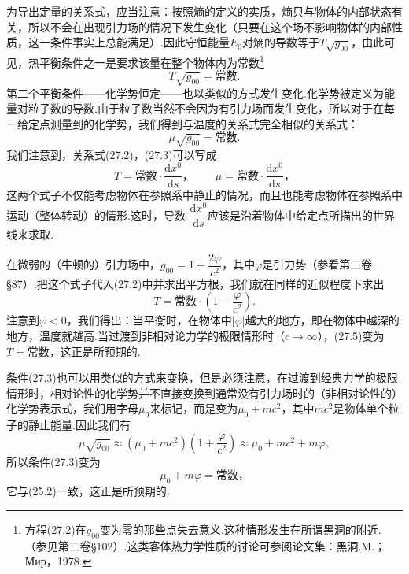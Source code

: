 为导出定量的关系式，应当注意：按照熵的定义的实质，熵只与物体的内部状态有关，所以不会在出现引力场的情况下发生变化（只要在这个场不影响物体的内部性质，这一条件事实上总能满足）.因此守恒能量$E_0$对熵的导数等于$T\sqrt{g_{00}}$，由此可见，热平衡条件之一是要求该量在整个物体内为常数\footnote{方程(27.2)在$g_{00}$变为零的那些点失去意义.这种情形发生在所谓黑洞的附近.（参见第二卷§102）.这类客体热力学性质的讨论可参阅论文集：黑洞.M.；Мир，1978.}
\begin{equation}
  T\sqrt{g_{00}}=\text{常数.}
\end{equation}
第二个平衡条件——化学势恒定——也以类似的方式发生变化.化学势被定义为能量对粒子数的导数.由于粒子数当然不会因为有引力场而发生变化，所以对于在每一给定点测量到的化学势，我们得到与温度的关系式完全相似的关系式：
\begin{equation}
  \mu\sqrt{g_{00}}=\text{常数.}
\end{equation}
我们注意到，关系式(27.2)，(27.3)可以写成
\begin{equation}
  T=\text{常数}\cdot\frac{\mathrm{d}x^0}{\mathrm{d}s}\text{，}\qquad
  \mu=\text{常数}\cdot\frac{\mathrm{d}x^0}{\mathrm{d}s}\text{，}
\end{equation}
这两个式子不仅能考虑物体在参照系中静止的情况，而且也能考虑物体在参照系中运动（整体转动）的情形.这时，导数
$\dfrac{\mathrm{d}x^0}{\mathrm{d}s}$应该是沿着物体中给定点所描出的世界线来求取.

在微弱的（牛顿的）引力场中，$g_{00}=1+\dfrac{2\varphi}{c^2}$，其中$\varphi$是引力势（参看第二卷§87）.把这个式子代入(27.2)中并求出平方根，我们就在同样的近似程度下求出
\begin{equation}
  T=\text{常数}\cdot\left(1-\frac{\varphi}{c^2}\right).
\end{equation}
注意到$\varphi<0$，我们得出：当平衡时，在物体中$|\varphi|$越大的地方，即在物体中越深的地方，温度就越高.当过渡到非相对论力学的极限情形时（$c\to\infty$），(27.5)变为$T=$常数，这正是所预期的.

条件(27.3)也可以用类似的方式来变换，但是必须注意，在过渡到经典力学的极限情形时，相对论性的化学势并不直接变换到通常没有引力场时的（非相对论性的）化学势表示式，我们用字母$\mu_0$来标记，而是变为$\mu_0+mc^2$，其中$mc^2$是物体单个粒子的静止能量.因此我们有
\begin{equation*}
  \mu\sqrt{g_{00}}
  \approx(\mu_0+mc^2)\left(1+\frac{\varphi}{c^2}\right)
  \approx\mu_0+mc^2+m\varphi,
\end{equation*}
所以条件(27.3)变为
\begin{equation*}
  \mu_0+m\varphi=\text{常数，}
\end{equation*}
它与(25.2)一致，这正是所预期的.


